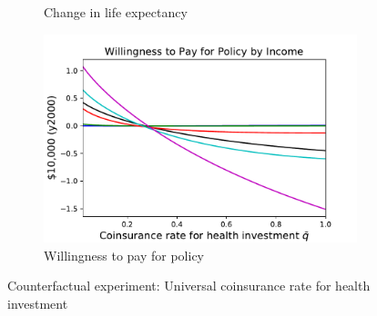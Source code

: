\documentclass[12pt,pdftex,letterpaper]{article}
\begin{document}
\begin{figure}[h!]
\begin{subfigure}[b]{0.49\textwidth}
        \caption{Change in life expectancy}
    \end{subfigure}
    \begin{subfigure}[b]{0.49\textwidth}
        \centering
        \includegraphics[width=\textwidth]{../Figures/FlatCopayInvstWTP.pdf}
        \caption{Willingness to pay for policy}
    \end{subfigure}
    \caption{Counterfactual experiment: Universal coinsurance rate for health investment}
    \label{fig:FlatCopayInvst}
\end{figure}

\newpage
\end{document}
